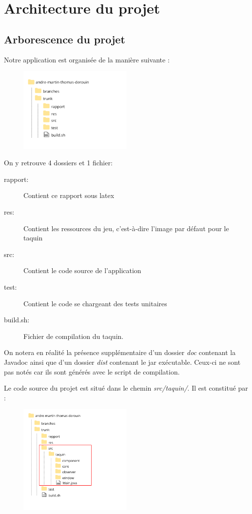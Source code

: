 \chapter{Architecture du projet}

	\section{Arborescence du projet}

		Notre application est organisée de la manière suivante :


		\begin{figure}[H]
			\centering
			\includegraphics[width=0.5\textwidth, keepaspectratio]{img/racine.png}
		\end{figure}

		On y retrouve 4 dossiers et 1 fichier:

		\begin{description}
			\item [rapport:] Contient ce rapport sous latex
			\item [res:] Contient les ressources du jeu, c'est-à-dire l’image par défaut pour le taquin
			\item [src:] Contient le code source de l’application
			\item [test:] Contient le code se chargeant des tests unitaires
			\item [build.sh:] Fichier de compilation du taquin.
		\end{description}

		On notera en réalité la présence supplémentaire d'un dossier \textit{doc} contenant la Javadoc ainsi que d'un dossier \textit{dist} contenant le jar exécutable. Ceux-ci ne sont pas notés car ils sont générés avec le script de compilation.

		Le code source du projet est situé dans le chemin \textit{src/taquin/}. Il est constitué par :

		\begin{figure}[H]
			\centering
			\includegraphics[width=0.5\textwidth, keepaspectratio]{img/detail.png}
		\end{figure}

